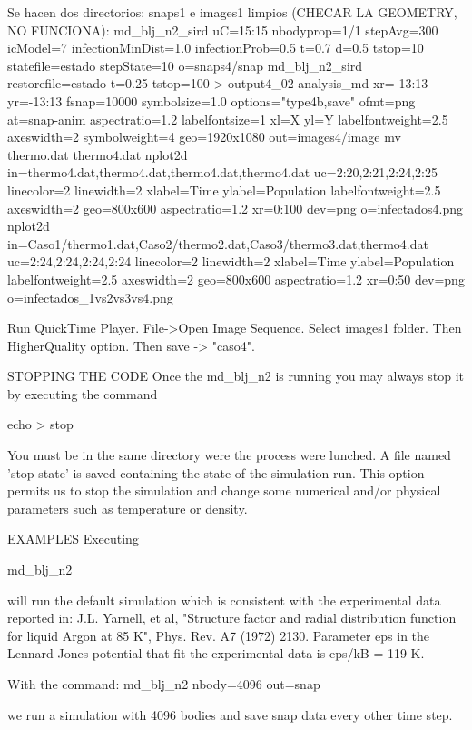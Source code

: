 Se hacen dos directorios: snaps1 e images1 limpios (CHECAR LA GEOMETRY, NO FUNCIONA):
md_blj_n2_sird uC=15:15 nbodyprop=1/1 stepAvg=300 icModel=7 infectionMinDist=1.0 infectionProb=0.5 t=0.7 d=0.5 tstop=10 statefile=estado stepState=10  o=snaps4/snap%
md_blj_n2_sird restorefile=estado t=0.25 tstop=100 > output4_02
analysis_md xr=-13:13 yr=-13:13 fsnap=10000 symbolsize=1.0 options="type4b,save" ofmt=png at=snap-anim  aspectratio=1.2 labelfontsize=1 xl=X yl=Y labelfontweight=2.5 axeswidth=2 symbolweight=4 geo=1920x1080 out=images4/image%
mv thermo.dat thermo4.dat
nplot2d in=thermo4.dat,thermo4.dat,thermo4.dat,thermo4.dat uc=2:20,2:21,2:24,2:25 linecolor=2 linewidth=2 xlabel=Time ylabel=Population labelfontweight=2.5 axeswidth=2 geo=800x600 aspectratio=1.2 xr=0:100 dev=png o=infectados4.png
nplot2d in=Caso1/thermo1.dat,Caso2/thermo2.dat,Caso3/thermo3.dat,thermo4.dat uc=2:24,2:24,2:24,2:24 linecolor=2 linewidth=2 xlabel=Time ylabel=Population labelfontweight=2.5 axeswidth=2 geo=800x600 aspectratio=1.2 xr=0:50 dev=png o=infectados_1vs2vs3vs4.png

Run QuickTime Player.  File->Open Image Sequence. Select images1 folder. Then HigherQuality option. Then save -> "caso4".





STOPPING THE CODE
       Once the md_blj_n2 is running you may always stop it by executing the command

       echo > stop

       You must be in the same directory were the process were lunched.  A file named 'stop-state' is saved containing
       the state of the simulation run. This option permits us to stop the simulation and change some numerical and/or
       physical parameters such as temperature or density.

EXAMPLES
       Executing

       md_blj_n2

       will run the default simulation which is consistent with the experimental data reported in: J.L. Yarnell, et al,
       "Structure factor and radial distribution function for liquid Argon at 85 K", Phys. Rev. A7 (1972) 2130.
       Parameter eps in the Lennard-Jones potential that fit the experimental data is eps/kB = 119 K.

       With the command: md_blj_n2 nbody=4096 out=snap%

       we run a simulation with 4096 bodies and save snap data every other time step.

